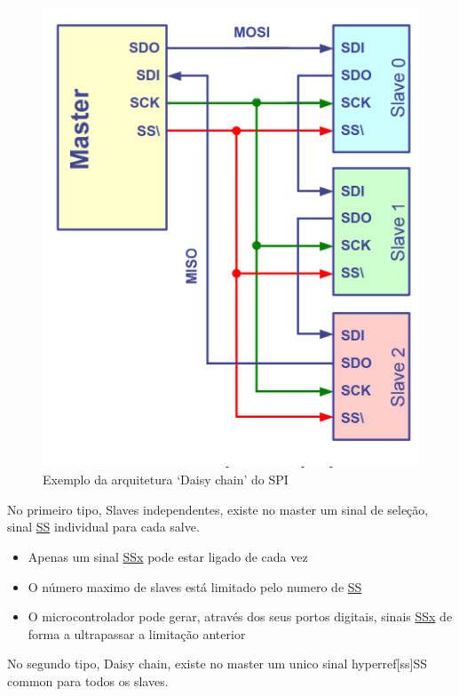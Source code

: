 \documentclass[a4paper, 12pt, onecolumn, twoside]{article}
\begin{document}
\begin{figure}[H]
\begin{minipage}{0.48\textwidth}
        \includegraphics[width=\textwidth]{Arquitetura-de-ligação-2_SPI.png}
        \caption{Exemplo da arquitetura `Daisy chain' do SPI}
    \end{minipage}
\end{figure}

No primeiro tipo, Slaves independentes, existe no master um sinal de seleção, 
sinal \hyperref[ss]{SS} individual para cada salve.
\begin{itemize}
    \item Apenas um sinal \hyperref[ss]{SSx} pode estar ligado de cada vez
    \item O número maximo de slaves está limitado pelo numero de \hyperref[ss]{SS}
    \item O microcontrolador pode gerar, através dos seus portos digitais, sinais \hyperref[ss]{SSx} de forma a ultrapassar a limitação anterior  
\end{itemize}

\clearpage
No segundo tipo, Daisy chain, existe no master um unico sinal hyperref[ss]{SS} common para todos os slaves.
\end{document}
